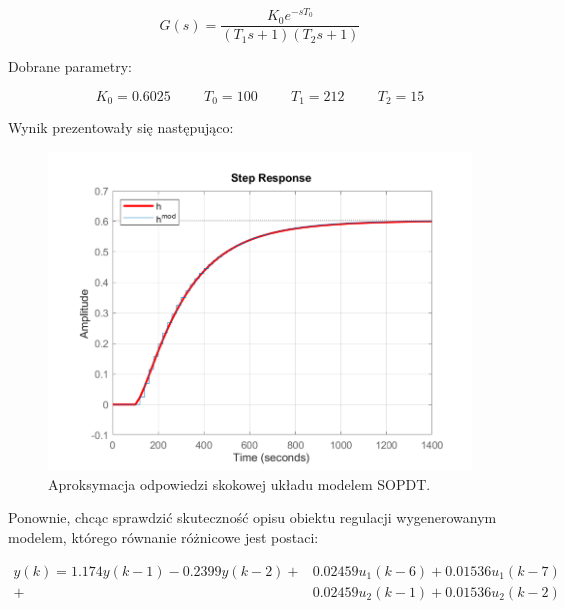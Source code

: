 \begin{equation}
G(s) = \frac{K_0e^{-sT_0}}{(T_1s + 1)(T_2s + 1)}
\end{equation}

\noindent Dobrane parametry:

\begin{equation}
K_0 = \num{0.6025} \hspace{1cm} T_0 = 100 \hspace{1cm} T_1 = 212 \hspace{1cm} T_2 = 15
\end{equation}

\noindent Wynik prezentowały się następująco:

\begin{figure}[h!]
\centering
\includegraphics[width=\textwidth]{pictures/model_sopdt}
\caption{Aproksymacja odpowiedzi skokowej układu modelem SOPDT.}
\end{figure}

\newpage

Ponownie, chcąc sprawdzić skuteczność opisu obiektu regulacji wygenerowanym modelem, którego równanie różnicowe jest postaci:

\begin{equation}
\begin{aligned}
y(k) = \num{1.174} y(k-1) - \num{0.2399} y(k-2) + &\num{0.02459} u_1(k-6) + \num{0.01536} u_1(k-7) \\ 
+&\num{0.02459} u_2(k-1) + \num{0.01536} u_2(k-2) 
\end{aligned}
\label{diff_eq}
\end{equation}

